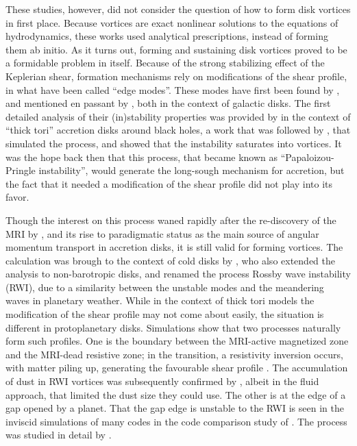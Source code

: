 \documentclass[apj]{emulateapj}
\begin{document}
These studies, however, did not consider the question of how to
form disk vortices in first place. Because vortices are exact nonlinear solutions to the equations of
hydrodynamics, these works used analytical prescriptions, instead of
forming them ab initio. As it turns out, forming and
sustaining disk vortices proved to be a formidable problem in
itself. Because of the strong stabilizing effect of the Keplerian
shear, formation mechanisms rely on modifications of the shear
profile, in what have been called ``edge modes''. These modes have
first been found by \citet{Lovelace-Hohlfeld78}, and mentioned en
passant by \citet{Toomre81}, both in the context of galactic disks. The first detailed analysis of their
(in)stability properties was provided by \citet{Papaloizou-Pringle84,Papaloizou-Pringle85} in the
context of ``thick tori'' accretion disks around
black holes, a work that was followed by \citet{Hawley87}, that
simulated the process, and showed that the instability saturates into
vortices. It was the hope back then that this process, that became
known as ``Papaloizou-Pringle instability'', would generate the
long-sough mechanism for accretion, but the fact that it needed a
modification of the shear profile did not play into its favor. 

Though the interest on this process waned rapidly after the re-discovery of the MRI
\citep{Velikhov59,Chandrasekhar60,Chandrasekhar61} by \citep{Balbus-Hawley91}, and
its rise to paradigmatic status as the main source of angular momentum
transport in accretion disks, it is still valid for forming
vortices. The calculation was brough to the context of cold disks by
\citet{Lovelace99}, who also extended the analysis to
non-barotropic disks, and renamed the process Rossby wave instability
(RWI), due to a similarity between the unstable modes and the
meandering waves in planetary weather. While in the context of thick
tori models the modification of the shear profile may not come about
easily, the situation is different in protoplanetary
disks. Simulations show that two processes naturally form such
profiles. One is the boundary between the MRI-active magnetized zone
and the MRI-dead resistive zone; in the transition, a resistivity
inversion occurs, with matter piling up, generating the favourable
shear profile \cite{Varniere-Tagger06}. The accumulation of dust in
RWI vortices was subsequently confirmed by \citet{Inaba-Barge06},
albeit in the fluid approach, that limited the dust size they could
use. The other is at the edge of a gap opened by a planet. That the
gap edge is unstable to the RWI is seen in the inviscid simulations 
of many codes in the code comparison study of \citet{deValBorro06}. 
The process was studied in detail by \citet{deValBorro07}. 
\end{document}
